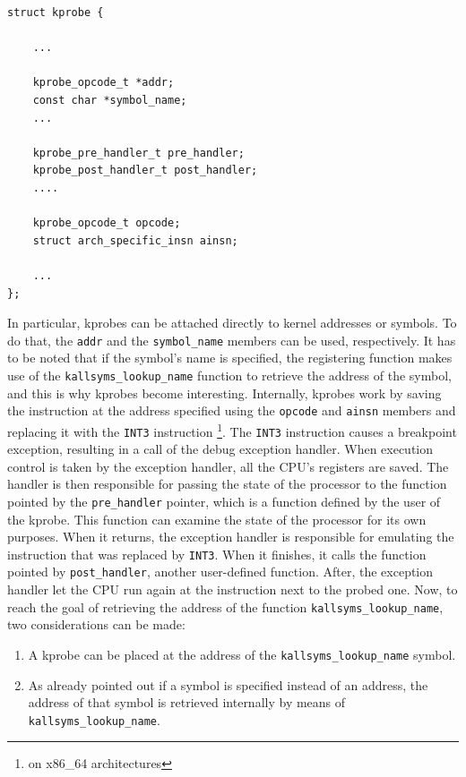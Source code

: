 \begin{lstlisting}[style=c, caption={Relevant fields of struct kprobe}, label={list:kprobe}]
struct kprobe {

    ...
    
    kprobe_opcode_t *addr;
    const char *symbol_name;
    ...

    kprobe_pre_handler_t pre_handler;
    kprobe_post_handler_t post_handler;
    ....
    
    kprobe_opcode_t opcode;
    struct arch_specific_insn ainsn;

    ...
};
\end{lstlisting}
In particular, kprobes can be attached directly to kernel addresses or symbols. To do that, the \texttt{addr} and the \texttt{symbol\_name} members can be used, respectively. It has to be noted that if the symbol's name is specified, the registering function makes use of the \texttt{kallsyms\_lookup\_name} function to retrieve the address of the symbol, and this is why kprobes become interesting. Internally, kprobes work by saving the instruction at the address specified using the \texttt{opcode} and \texttt{ainsn} members and replacing it with the \texttt{INT3} instruction \footnote{on x86\_64 architectures}. The \texttt{INT3} instruction causes a breakpoint exception, resulting in a call of the debug exception handler. When execution control is taken by the exception handler, all the CPU's registers are saved. The handler is then responsible for passing the state of the processor to the function pointed by the \texttt{pre\_handler} pointer, which is a function defined by the user of the kprobe. This function can examine the state of the processor for its own purposes. When it returns, the exception handler is responsible for emulating the instruction that was replaced by \texttt{INT3}. When it finishes, it calls the function pointed by \texttt{post\_handler}, another user-defined function. After, the exception handler let the CPU run again at the instruction next to the probed one. Now, to reach the goal of retrieving the address of the function \texttt{kallsyms\_lookup\_name}, two considerations can be made: 
\begin{enumerate}
    \item A kprobe can be placed at the address of the \texttt{kallsyms\_lookup\_name} symbol.
    \item As already pointed out if a symbol is specified instead of an address, the address of that symbol is retrieved internally by means of \texttt{kallsyms\_lookup\_name}.
\end{enumerate}
